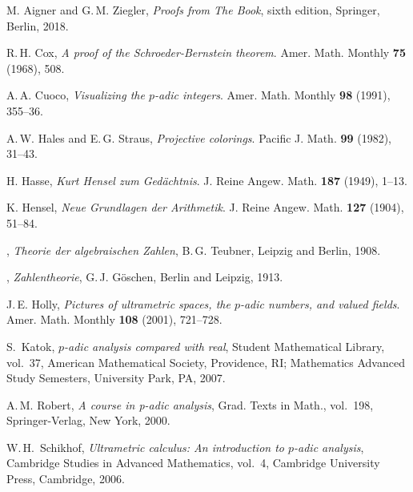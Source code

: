 \let\oldaddcontentsline\addcontentsline
\renewcommand{\addcontentsline}[3]{}
\begin{thebibliography}{11}

 M. Aigner and {G.\,M}. Ziegler, \emph{Proofs from The Book},
sixth edition, Springer, Berlin, 2018.

 R.\,H. Cox, \emph{A proof of the {S}chroeder-{B}ernstein theorem}. Amer. Math. Monthly \textbf{75} (1968), 508.

 {A.\,A.} Cuoco,
\emph{Visualizing the $p$-adic integers}. Amer. Math. Monthly \textbf{98} (1991), 355--36.

 {A.\,W.} Hales and {E.\,G.} Straus, \emph{Projective colorings}. Pacific J. Math. \textbf{99} (1982), 31--43. 

 H. Hasse, \emph{Kurt Hensel zum Gedächtnis}. J. Reine Angew. Math. \textbf{187} (1949), 1--13.

 K. Hensel, \emph{Neue Grundlagen der Arithmetik}. J. Reine Angew. Math. \textbf{127} (1904), 51--84.

 \bysame, \emph{Theorie der algebraischen Zahlen}, {B.\,G.} Teubner, Leipzig and Berlin, 1908.  

 \bysame, \emph{Zahlentheorie}, {G.\,J.} Göschen, Berlin and Leipzig, 1913.  

 {J.\,E.} Holly, 
\emph{Pictures of ultrametric spaces, the $p$-adic numbers, and valued fields}. Amer. Math. Monthly \textbf{108} (2001), 721--728.

 S.~Katok, \emph{{$p$}-adic analysis compared with real}, Student Mathematical Library, vol.~37, American Mathematical Society, Providence, RI; Mathematics Advanced Study Semesters, University Park, PA, 2007. 

 {A.\,M.} Robert, \emph{A course in p-adic analysis}, Grad. Texts in Math., vol.~198, Springer-Verlag, New York, 2000.   

 {W.\,H.}~Schikhof, \emph{Ultrametric calculus:  An introduction to $p$-adic analysis}, Cambridge Studies in Advanced Mathematics, vol.~4, Cambridge University Press, Cambridge, 2006.
 \end{thebibliography}
\let\addcontentsline\oldaddcontentsline

